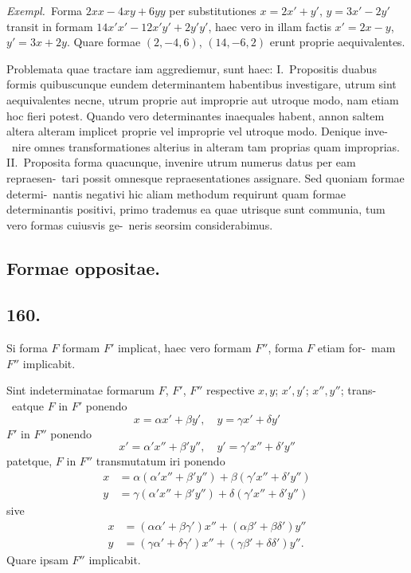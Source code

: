 \documentclass[12pt,a4paper]{article}
\theoremstyle{plain}
\theoremstyle{definition}
\theoremstyle{remark}
\begin{document}
\emph{Exempl.}\ Forma $2xx - 4xy + 6yy$ per substitutiones $x = 2x' + y'$,
$y = 3x' - 2y'$ transit in formam $14x'x' - 12x'y' + 2y'y'$, haec vero in illam factis
$x' = 2x - y$, $y' = 3x + 2y$. Quare formae $(2, -4, 6)$, $(14, -6, 2)$
erunt proprie aequivalentes.

Problemata quae tractare iam aggrediemur, sunt haec: I.\ Propositis duabus
formis quibuscunque eundem determinantem habentibus investigare, utrum sint
aequivalentes necne, utrum proprie aut improprie aut utroque modo, nam etiam
hoc fieri potest. Quando vero determinantes inaequales habent, annon saltem
altera alteram implicet proprie vel improprie vel utroque modo. Denique inve-\ nire omnes transformationes alterius in alteram tam proprias quam improprias.
II.\ Proposita forma quacunque, invenire utrum numerus datus per eam repraesen-\ tari possit omnesque repraesentationes assignare. Sed quoniam formae determi-\ nantis negativi hic aliam methodum requirunt quam formae determinantis positivi,
primo trademus ea quae utrisque sunt communia, tum vero formas cuiusvis ge-\ neris seorsim considerabimus.

\subsection*{Formae oppositae.}

\subsection*{160.}

Si forma $F$ formam $F'$ implicat, haec vero formam $F''$, forma $F$ etiam for-\ mam $F''$ implicabit.

Sint indeterminatae formarum $F$, $F'$, $F''$ respective $x,y$; $x',y'$; $x'',y''$; trans-\ eatque $F$ in $F'$ ponendo
\[
x = \alpha x' + \beta y', \quad y = \gamma x' + \delta y'
\]
$F'$ in $F''$ ponendo
\[
x' = \alpha' x'' + \beta' y'', \quad y' = \gamma' x'' + \delta' y''
\]
patetque, $F$ in $F''$ transmutatum iri ponendo
\begin{align*}
x &= \alpha(\alpha' x'' + \beta' y'') + \beta(\gamma' x'' + \delta' y'') \\
y &= \gamma(\alpha' x'' + \beta' y'') + \delta(\gamma' x'' + \delta' y'')
\end{align*}
sive
\begin{align*}
x &= (\alpha\alpha' + \beta\gamma')x'' + (\alpha\beta' + \beta\delta')y'' \\
y &= (\gamma\alpha' + \delta\gamma')x'' + (\gamma\beta' + \delta\delta')y''.
\end{align*}
Quare ipsam $F''$ implicabit.
\end{document}
